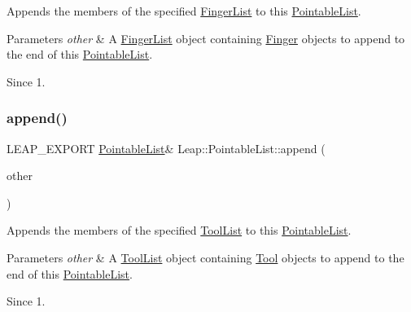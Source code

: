 Appends the members of the specified \hyperlink{class_leap_1_1_finger_list}{Finger\+List} to this \hyperlink{class_leap_1_1_pointable_list}{Pointable\+List}. 
\begin{DoxyParams}{Parameters}
{\em other} & A \hyperlink{class_leap_1_1_finger_list}{Finger\+List} object containing \hyperlink{class_leap_1_1_finger}{Finger} objects to append to the end of this \hyperlink{class_leap_1_1_pointable_list}{Pointable\+List}. \\
\hline
\end{DoxyParams}
\begin{DoxySince}{Since}
1. 
\end{DoxySince}
\mbox{\label{class_leap_1_1_pointable_list_a091f0c1a7030f5f91701dd54f73a98de}} 
\subsubsection{\texorpdfstring{append()}{append()}\hspace{0.1cm}{\footnotesize\ttfamily [3/3]}}
{\footnotesize\ttfamily L\+E\+A\+P\+\_\+\+E\+X\+P\+O\+RT \hyperlink{class_leap_1_1_pointable_list}{Pointable\+List}\& Leap\+::\+Pointable\+List\+::append (\begin{DoxyParamCaption}\item[{const \hyperlink{class_leap_1_1_tool_list}{Tool\+List} \&}]{other }\end{DoxyParamCaption})}

Appends the members of the specified \hyperlink{class_leap_1_1_tool_list}{Tool\+List} to this \hyperlink{class_leap_1_1_pointable_list}{Pointable\+List}. 
\begin{DoxyParams}{Parameters}
{\em other} & A \hyperlink{class_leap_1_1_tool_list}{Tool\+List} object containing \hyperlink{class_leap_1_1_tool}{Tool} objects to append to the end of this \hyperlink{class_leap_1_1_pointable_list}{Pointable\+List}. \\
\hline
\end{DoxyParams}
\begin{DoxySince}{Since}
1. 
\end{DoxySince}
\mbox{\label{class_leap_1_1_pointable_list_ad42582cce88a166f2ac21718082087ad}} 
